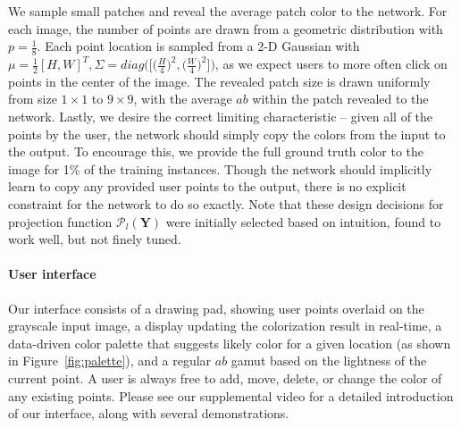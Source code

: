\documentclass[acmtog,authorversion]{acmart}
\begin{document}
We sample small patches and reveal the average patch color to the network. For each image, the number of points are drawn from a geometric distribution with $p=\tfrac{1}{8}$. Each point location is sampled from a 2-D Gaussian with $\mu=\tfrac{1}{2}[H,W]^{T}, \Sigma=diag \big( \big[ \big( \tfrac{H}{4} \big) ^{2},\big( \tfrac{W}{4} \big) ^{2} \big] \big)$, as we expect users to more often click on points in the center of the image. The revealed patch size is drawn uniformly from size $1\times 1$ to $9\times 9$, with the average $ab$ within the patch revealed to the network. Lastly, we desire the correct limiting characteristic -- given all of the points by the user, the network should simply copy the colors from the input to the output. To encourage this, we provide the full ground truth color to the image for 1\% of the training instances. Though the network should implicitly learn to copy any provided user points to the output, there is no explicit constraint for the network to do so exactly. Note that these design decisions for projection function $\mathcal{P}_l(\mathbf{Y})$ were initially selected based on intuition, found to work well, but not finely tuned.

\paragraph{User interface} Our interface consists of a drawing pad, showing user points overlaid on the grayscale input image, a display updating the colorization result in real-time, a data-driven color palette that suggests likely color for a given location (as shown in Figure~\ref{fig:palette}), and a regular $ab$ gamut based on the lightness of the current point. A user is always free to add, move, delete, or change the color of any existing points. Please see our supplemental video for a detailed introduction of our interface, along with several demonstrations. 
\end{document}
